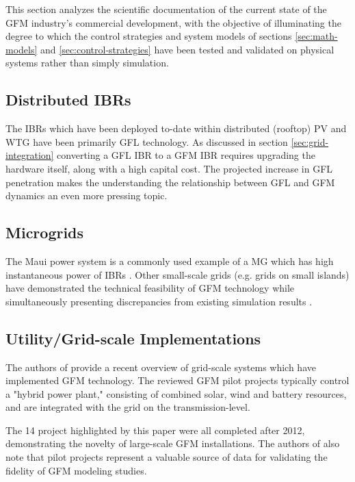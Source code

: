 \label{sec:commericial-demonstrations}

This section analyzes the scientific documentation of the
current state of the GFM industry's commercial development,
with the objective of illuminating the degree to which
the control strategies and system models of sections
\ref{sec:math-models} and \ref{sec:control-strategies}
have been tested and validated on physical systems rather
than simply simulation.

\subsection{Distributed IBRs}
The IBRs which have been deployed to-date within
distributed (rooftop) PV \cite{noauthor_grid_2021} and WTG \cite{nguyen_grid-forming_2022}
have been primarily GFL technology. As discussed in section \ref{sec:grid-integration}
converting a GFL IBR to a GFM IBR requires upgrading
the hardware itself, along with a high capital cost. The projected
increase in GFL penetration makes the understanding the relationship
between GFL and GFM dynamics an even more pressing topic.

\subsection{Microgrids}
The Maui power system is a commonly used example of a MG which has 
high instantaneous power of IBRs \cite{kenyon_criticality_2023}.
Other small-scale grids (e.g. grids on small islands) have demonstrated the technical
feasibility of GFM technology \cite{lin_research_2020} while simultaneously presenting 
discrepancies from existing simulation results \cite{kenyon_criticality_2023}.

\subsection{Utility/Grid-scale Implementations}
The authors of \cite{musca_grid-forming_2022}
provide a recent overview of grid-scale systems which have implemented GFM
technology. The reviewed GFM pilot projects typically control a "hybrid power plant,"
consisting of combined solar, wind and battery resources, and are integrated with the grid
on the transmission-level.

The 14 project highlighted by this paper were all completed after 2012, demonstrating
the novelty of large-scale GFM installations. The authors of \cite{musca_grid-forming_2022}
also note that pilot projects represent a valuable source of data for validating
the fidelity of GFM modeling studies.
